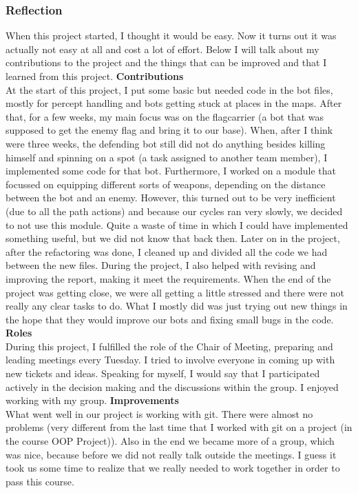 \subsubsection{Reflection}
When this project started, I thought it would be easy. Now it turns out it was actually not easy at all and cost a lot of effort. Below I will talk about my contributions to the project and the things that can be improved and that I learned from this project.
\noindent
\textbf{Contributions}\\
At the start of this project, I put some basic but needed code in the bot files, mostly for percept handling and bots getting stuck at places in the maps. After that, for a few weeks, my main focus was on the flagcarrier (a bot that was supposed to get the enemy flag and bring it to our base). When, after I think were three weeks, the defending bot still did not do anything besides killing himself and spinning on a spot (a task assigned to another team member), I implemented some code for that bot.
Furthermore, I worked on a module that focussed on equipping different sorts of weapons, depending on the distance between the bot and an enemy. However, this turned out to be very inefficient (due to all the path actions) and because our cycles ran very slowly, we decided to not use this module. Quite a waste of time in which I could have implemented something useful, but we did not know that back then.
Later on in the project, after the refactoring was done, I cleaned up and divided all the code we had between the new files. During the project, I also helped with revising and improving the report, making it meet the requirements.
When the end of the project was getting close, we were all getting a little stressed and there were not really any clear tasks to do. What I mostly did was just trying out new things in the hope that they would improve our bots and fixing small bugs in the code.
\noindent
\textbf{Roles}\\
During this project, I fulfilled the role of the Chair of Meeting, preparing and leading meetings every Tuesday. I tried to involve everyone in coming up with new tickets and ideas. Speaking for myself, I would say that I participated actively in the decision making and the discussions within the group. I enjoyed working with my group.
\noindent
\textbf{Improvements}\\
What went well in our project is working with git. There were almost no problems (very different from the last time that I worked with git on a project (in the course OOP Project)). Also in the end we became more of a group, which was nice, because before we did not really talk outside the meetings. I guess it took us some time to realize that we really needed to work together in order to pass this course.
